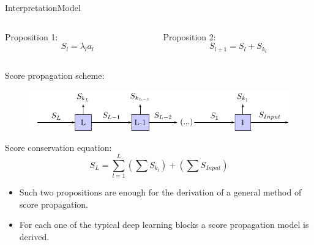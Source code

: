\documentclass{beamer}
\begin{document}
\begin{frame}{Interpretation}{Model}
\begin{columns}
	\begin{column}{0.5\textwidth}
\alert{Proposition 1:}
\begin{equation*}
S_l = \lambda_l a_{l}
\end{equation*}
	\end{column}
	\begin{column}{0.5\textwidth}
\alert{Proposition 2:}
\begin{equation*}
S_{l+1} = S_{l} + S_{k_l}
\end{equation*}
\end{column}
\end{columns}
\hfill \break
\alert{Score propagation scheme:}
\begin{figure}[h!]
	\centering
	\includegraphics[scale=0.85]{score_map.pdf}
\end{figure}
\alert{Score conservation equation:}
\begin{equation*}
S_L = \sum_{l=1}^L \left ( \sum S_{k_l} \right ) + \left ( \sum S_{Input} \right )
\end{equation*}
\begin{itemize}
	\item Such two propositions are enough for the derivation of a general method of score propagation.
	\item For each one of the typical deep learning blocks a score propagation model is derived.
\end{itemize}
\end{frame}
\end{document}
